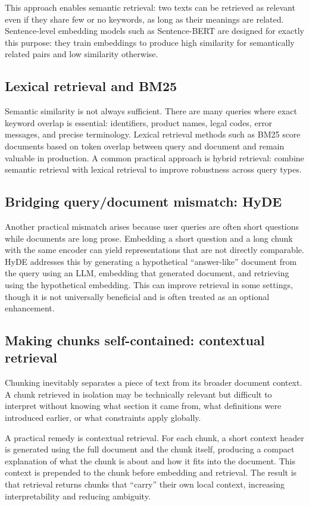 This approach enables semantic retrieval: two texts can be retrieved as relevant even if they share few or no keywords, as long as their meanings are related. Sentence-level embedding models such as Sentence-BERT are designed for exactly this purpose: they train embeddings to produce high similarity for semantically related pairs and low similarity otherwise.

\subsection{Lexical retrieval and BM25}
Semantic similarity is not always sufficient. There are many queries where exact keyword overlap is essential: identifiers, product names, legal codes, error messages, and precise terminology. Lexical retrieval methods such as BM25 score documents based on token overlap between query and document and remain valuable in production. A common practical approach is hybrid retrieval: combine semantic retrieval with lexical retrieval to improve robustness across query types.

\subsection{Bridging query/document mismatch: HyDE}
Another practical mismatch arises because user queries are often short questions while documents are long prose. Embedding a short question and a long chunk with the same encoder can yield representations that are not directly comparable. HyDE addresses this by generating a hypothetical “answer-like” document from the query using an LLM, embedding that generated document, and retrieving using the hypothetical embedding. This can improve retrieval in some settings, though it is not universally beneficial and is often treated as an optional enhancement.

\subsection{Making chunks self-contained: contextual retrieval}
Chunking inevitably separates a piece of text from its broader document context. A chunk retrieved in isolation may be technically relevant but difficult to interpret without knowing what section it came from, what definitions were introduced earlier, or what constraints apply globally.

A practical remedy is contextual retrieval. For each chunk, a short context header is generated using the full document and the chunk itself, producing a compact explanation of what the chunk is about and how it fits into the document. This context is prepended to the chunk before embedding and retrieval. The result is that retrieval returns chunks that “carry” their own local context, increasing interpretability and reducing ambiguity.

